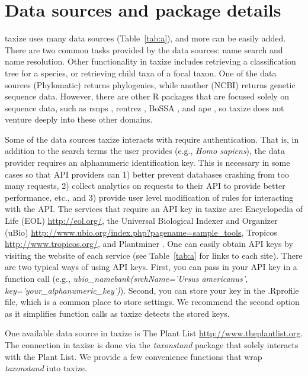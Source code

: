 \documentclass[10pt,a4paper,twocolumn]{article}\usepackage[]{graphicx}\usepackage[]{color}
\begin{document}
\section*{Data sources and package details}
taxize uses many data sources (Table~\ref{tab:a}), and more can be easily added. There are two common tasks provided by the data sources: name search and name resolution. Other functionality in taxize includes retrieving a classification tree for a species, or retrieving child taxa of a focal taxon. One of the data sources (Phylomatic) returns phylogenies, while another (NCBI) returns genetic sequence data. However, there are other R packages that are focused solely on sequence data, such as rsnps \cite{chamberlain2013}, rentrez \cite{winter2013}, BoSSA \cite{lefeuvre2010}, and ape \cite{paradis2004}, so taxize does not venture deeply into these other domains. 

Some of the data sources taxize interacts with require authentication. That is, in addition to the search terms the user provides (e.g., \emph{Homo sapiens}), the data provider requires an alphanumeric identification key. This is necessary in some cases so that API providers can 1) better prevent databases crashing from too many requests, 2) collect analytics on requests to their API to provide better performance, etc., and 3) provide user level modification of rules for interacting with the API. The services that require an API key in taxize are: Encyclopedia of Life (EOL) \url{http://eol.org/}, the Universal Biological Indexer and Organizer (uBio) \url{http://www.ubio.org/index.php?pagename=sample_tools}, Tropicos \url{http://www.tropicos.org/}, and Plantminer \cite{carvalho2010plantminer}. One can easily obtain API keys by visiting the website of each service (see Table~\ref{tab:a} for links to each site). There are two typical ways of using API keys. First, you can pass in your API key in a function call (e.g., \emph{ubio\_namebank(srchName='Ursus americanus', key='your\_alphanumeric\_key')}). Second, you can store your key in the .Rprofile file, which is a common place to store settings. We recommend the second option as it simplifies function calls as taxize detects the stored keys.

One available data source in taxize is The Plant List \url{http://www.theplantlist.org}. The connection in taxize is done via the \emph{taxonstand} package \cite{Cayuela_2012,taxonstand} that solely interacts with the Plant List. We provide a few convenience functions that wrap \emph{taxonstand} into taxize.
\end{document}
